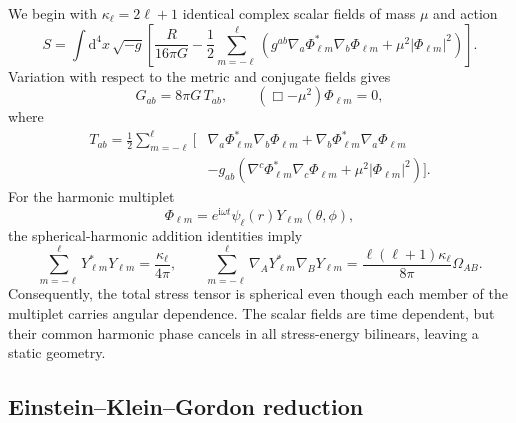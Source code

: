 \documentclass[aps,prd,preprint,onecolumn,nofootinbib,superscriptaddress,showkeys]{revtex4-2}
\newcommand{\dd}{\mathrm{d}}
\newcommand{\ii}{\mathrm{i}}
\begin{document}
We begin with $\kappa_{\ell}=2\ell+1$ identical complex scalar fields of mass $\mu$ and action
\begin{equation}
S=\int \dd^{4}x\,\sqrt{-g}\left[
\frac{R}{16\pi G}
-\frac{1}{2}\sum_{m=-\ell}^{\ell}
\left(g^{ab}\nabla_{a}\Phi_{\ell m}^{*}\nabla_{b}\Phi_{\ell m}
+\mu^{2}|\Phi_{\ell m}|^{2}\right)\right].
\label{eq:action}
\end{equation}
Variation with respect to the metric and conjugate fields gives
\begin{equation}
G_{ab}=8\pi G\,T_{ab},
\qquad
\left(\Box-\mu^{2}\right)\Phi_{\ell m}=0,
\label{eq:ekg}
\end{equation}
where
\begin{align}
T_{ab}=\frac{1}{2}\sum_{m=-\ell}^{\ell}\Big[
&\nabla_{a}\Phi_{\ell m}^{*}\nabla_{b}\Phi_{\ell m}
+\nabla_{b}\Phi_{\ell m}^{*}\nabla_{a}\Phi_{\ell m}\nonumber\\
&-g_{ab}\left(\nabla^{c}\Phi_{\ell m}^{*}\nabla_{c}\Phi_{\ell m}
+\mu^{2}|\Phi_{\ell m}|^{2}\right)\Big].
\label{eq:stress}
\end{align}
For the harmonic multiplet
\begin{equation}
\Phi_{\ell m}=e^{\ii\omega t}\psi_{\ell}(r)Y_{\ell m}(\theta,\phi),
\label{eq:multiplet}
\end{equation}
the spherical-harmonic addition identities imply
\begin{equation}
\sum_{m=-\ell}^{\ell}Y_{\ell m}^{*}Y_{\ell m}
=\frac{\kappa_{\ell}}{4\pi},
\qquad
\sum_{m=-\ell}^{\ell}\nabla_{A}Y_{\ell m}^{*}\nabla_{B}Y_{\ell m}
=\frac{\ell(\ell+1)\kappa_{\ell}}{8\pi}\Omega_{AB}.
\label{eq:addition}
\end{equation}
Consequently, the total stress tensor is spherical even though each member of the multiplet carries angular dependence. The scalar fields are time dependent, but their common harmonic phase cancels in all stress-energy bilinears, leaving a static geometry.

\subsection{Einstein--Klein--Gordon reduction}
\end{document}
